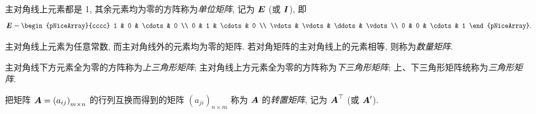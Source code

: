 \begin{definition}[单位矩阵]
    主对角线上元素都是 1, 其余元素均为零的方阵称为\textit{单位矩阵}, 记为 $ \vb*{E}$ (或 $ \vb*{I} $), 即
    $$\vb*{E}=\begin{pNiceArray}{cccc}
            1      & 0      & \cdots & 0      \\
            0      & 1      & \cdots & 0      \\
            \vdots & \vdots & \ddots & \vdots \\
            0      & 0      & \cdots & 1
        \end{pNiceArray} .$$
\end{definition}

\begin{definition}[数量矩阵]
    主对角线上元素为任意常数, 而主对角线外的元素均为零的矩阵. 若对角矩阵的主对角线上的元素相等, 则称为\textit{数量矩阵}.
\end{definition}

\begin{definition}[三角形矩阵]
    主对角线下方元素全为零的方阵称为\textit{上三角形矩阵}; 主对角线上方元素全为零的方阵称为\textit{下三角形矩阵}; 上、下三角形矩阵统称为\textit{三角形矩阵}.
\end{definition}

\begin{definition}[矩阵的转置]
    把矩阵 $ \vb*{A}=\left(a_{i j}\right)_{m \times n} $ 的行列互换而得到的矩阵 $ \left(a_{j i}\right)_{n \times m} $ 称为 $ \vb*{A} $ 的\textit{转置矩阵},
    记为 $ \vb*{A}^{\top} $ (或 $ \vb*{A}^{\prime} $).
\end{definition}

